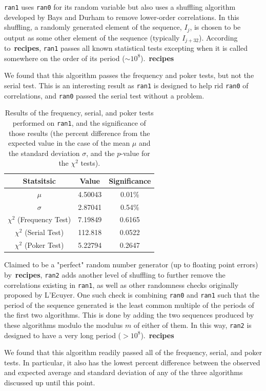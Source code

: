 \documentclass[12pt]{article}
\numberwithin{equation}{section}
\begin{document}
\par \texttt{ran1} uses \texttt{ran0} for its random variable but also uses a shuffling algorithm developed by Bays and Durham to remove lower-order correlations.  In this shuffling, a randomly generated element of the sequence, $I_{j}$, is chosen to be output as some other element of the sequence (typically $I_{j+32}$).  According to~\textbf{recipes}, \texttt{ran1} passes all known statistical tests excepting when it is called somewhere on the order of its period ($\sim10^{8}$).~\textbf{recipes}
\par We found that this algorithm passes the frequency and poker tests, but not the serial test.  This is an interesting result as \texttt{ran1} is designed to help rid \texttt{ran0} of correlations, and \texttt{ran0} passed the serial test without a problem.  

\begin{table}[ht]
\begin{center}
\begin{tabular}{c|c|c} \hline
Statsitsic & Value & Significance\\\hline
$\mu$ & 4.50043 & 0.01\%\\
$\sigma$ & 2.87041 & 0.54\%\\
$\chi^{2}$ (Frequency Test) & 7.19849 & 0.6165\\
$\chi^{2}$ (Serial Test) & 112.818 & 0.0522\\
$\chi^{2}$ (Poker Test) & 5.22794 & 0.2647\\ \hline
\end{tabular}
\caption{Results of the frequency, serial, and poker tests performed on \texttt{ran1}, and the significance of those results (the percent difference from the expected value in the case of the mean $\mu$ and the standard deviation $\sigma$, and the $p$-value for the $\chi^{2}$ tests).}
\label{tab:ran1results}
\end{center}
\end{table}

\par Claimed to be a "perfect" random number generator (up to floating point errors) by~\textbf{recipes}, \texttt{ran2} adds another level of shuffling to further remove the correlations existing in \texttt{ran1}, as well as other randomness checks originally proposed by L'Ecuyer.  One such check is combining \texttt{ran0} and \texttt{ran1} such that the period of the sequence generated is the least common multiple of the periods of the first two algorithms.  This is done by adding the two sequences produced by these algorithms modulo the modulus $m$ of either of them.  In this way, \texttt{ran2} is designed to have a very long period ($>10^{8}$).~\textbf{recipes}
\par We found that this algorithm readily passed all of the frequency, serial, and poker tests.  In particular, it also has the lowest percent difference between the observed and expected average and standard deviation of any of the three algorithms discussed up until this point.
\end{document}
